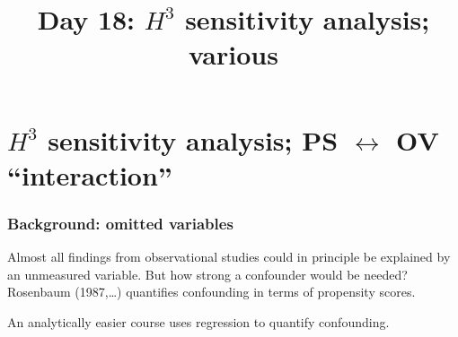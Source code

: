 

%

%





\title[Day 18]{Day 18: $H^{3}$ sensitivity analysis; various}


\usepackage{xspace}
\newcommand{\satm}{\mbox{\textsc{sat-m}}\xspace}
\newcommand{\satv}{\mbox{\textsc{sat-v}}\xspace}
\newcommand{\upm}{\mbox{\textsc{urm}}\xspace}
\newcommand{\asian}{\mbox{\textsc{asian}}\xspace}
\newcommand{\presatm}{\mbox{\textsc{pre-m}}\xspace}
\newcommand{\premath}{\mbox{\textsc{pre-m}}\xspace}
\newcommand{\presatv}{\mbox{\textsc{pre-v}}\xspace}
\newcommand{\preverb}{\mbox{\textsc{pre-v}}\xspace}
\newcommand{\parentsinc}{\mbox{\textsc{incm}}\xspace}
\newcommand{\gpa}{\mbox{\textsc{gpa}}\xspace}
\newcommand{\dadsed}{\mbox{\textsc{dadsed}}\xspace}
\newcommand{\momsed}{\mbox{\textsc{momsed}}\xspace}
\newcommand{\avgeng}{\mbox{\textsc{e-gpa}}\xspace}
\newcommand{\avgmath}{\mbox{\textsc{m-gpa}}\xspace}
\newcommand{\avgnatsci}{\mbox{\textsc{ns-gpa}}\xspace}
\newcommand{\avgssci}{\mbox{\textsc{ss-gpa}}\xspace}
\newcommand{\coach}{\mbox{\textsc{coach}}\xspace}
\newcommand{\dadcoll}{\mbox{\textsc{dadcoll}}\xspace}
\newcommand{\aavg}{\mbox{\textsc{a-avg}}\xspace}





\section{$H^{3}$ sensitivity analysis; PS $\leftrightarrow$ OV ``interaction''}


\begin{frame}
  \frametitle{Background: omitted variables}
  
  Almost all findings from observational studies could in principle be
  explained by an unmeasured variable. But how strong a confounder
  would be needed?  Rosenbaum (1987,\ldots) quantifies confounding in
  terms of propensity scores.
  
  \begin{center}
\end{center}

  An analytically easier course uses regression to quantify confounding. 
\end{frame}

